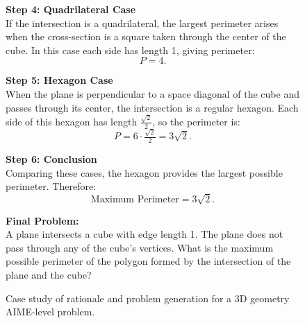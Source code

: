 \begin{figure}[htb]
{\begin{minipage}{0.99\textwidth}
              \vspace{0.5em}
              \noindent\textbf{Step 4: Quadrilateral Case} \\
              If the intersection is a quadrilateral, the largest perimeter arises when the cross-section is a square taken through the center of the cube. In this case each side has length 1, giving perimeter:
              \[
              P = 4.
              \]
  
              \vspace{0.5em}
              \noindent\textbf{Step 5: Hexagon Case} \\
              When the plane is perpendicular to a space diagonal of the cube and passes through its center, the intersection is a regular hexagon. Each side of this hexagon has length $\tfrac{\sqrt{2}}{2}$, so the perimeter is:
              \[
              P = 6 \cdot \tfrac{\sqrt{2}}{2} = 3\sqrt{2}.
              \]
  
              \vspace{0.5em}
              \noindent\textbf{Step 6: Conclusion} \\
              Comparing these cases, the hexagon provides the largest possible perimeter. Therefore:
              \[
              \text{Maximum Perimeter} = 3\sqrt{2}.
              \]
  
              \vspace{1em}
              \textbf{Final Problem:} \\
              A plane intersects a cube with edge length 1. The plane does not pass through any of the cube's vertices. What is the maximum possible perimeter of the polygon formed by the intersection of the plane and the cube?
          \end{minipage}%
      }
      \caption{Case study of rationale and problem generation for a 3D geometry AIME-level problem.}
      \label{fig:case_study_rationale2}
  \end{figure}
  
